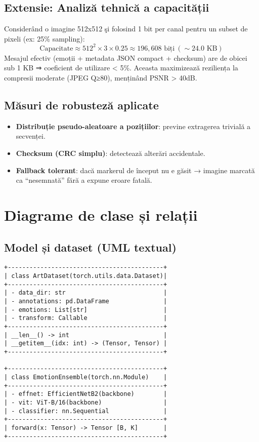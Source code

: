 \subsection*{Extensie: Analiză tehnică a capacității}
Considerând o imagine 512x512 şi folosind 1 bit per canal pentru un subset de pixeli (ex: 25\% sampling):
\[
\text{Capacitate} \approx 512^2 \times 3 \times 0.25 \approx 196{,}608 \text{ biți} \ (\sim 24.0 \text{ KB})
\]
Mesajul efectiv (emoții + metadata JSON compact + checksum) are de obicei sub 1 KB ⇒ coeficient de utilizare < 5\%. Aceasta maximizează reziliența la compresii moderate (JPEG Q≥80), menținând PSNR > 40dB.

\subsection*{Măsuri de robusteză aplicate}
\begin{itemize}
  \item \textbf{Distribuție pseudo-aleatoare a pozițiilor}: previne extragerea trivială a secvenței.
  \item \textbf{Checksum (CRC simplu)}: detectează alterări accidentale.
  \item \textbf{Fallback tolerant}: dacă markerul de început nu e găsit → imagine marcată ca “nesemnată” fără a expune eroare fatală.
\end{itemize}

\section{Diagrame de clase și relații}\label{sec:class_diagrams}

\subsection{Model și dataset (UML textual)}
\begin{verbatim}
+-------------------------------------------+
| class ArtDataset(torch.utils.data.Dataset)|
+-------------------------------------------+
| - data_dir: str                           |
| - annotations: pd.DataFrame               |
| - emotions: List[str]                     |
| - transform: Callable                     |
+-------------------------------------------+
| __len__() -> int                          |
| __getitem__(idx: int) -> (Tensor, Tensor) |
+-------------------------------------------+

+-------------------------------------------+
| class EmotionEnsemble(torch.nn.Module)    |
+-------------------------------------------+
| - effnet: EfficientNetB2(backbone)        |
| - vit: ViT-B/16(backbone)                 |
| - classifier: nn.Sequential               |
+-------------------------------------------+
| forward(x: Tensor) -> Tensor [B, K]       |
+-------------------------------------------+
\end{verbatim}

